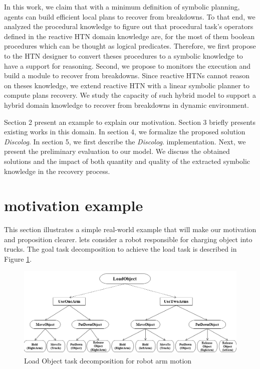 \documentclass[conference]{IEEEtran}
\begin{document}
	\par In this work, we claim  that with a minimum definition of symbolic planning, agents can build efficient local plans to recover from breakdowns. To that end, we analyzed the procedural knowledge to figure out that procedural task's operators defined in the reactive HTN domain knowledge are, for the most of them boolean procedures which can be thought as logical predicates. Therefore,  we first propose to the HTN designer to convert theses procedures to a symbolic knowledge to have a support for reasoning. Second, we propose to monitors the execution and build a module to recover from breakdowns. Since reactive HTNs cannot reason on theses knowledge, we  extend  reactive HTN  with a linear symbolic planner  to compute plans recovery.  We study the capacity of such hybrid model to support a hybrid domain knowledge to recover from breakdowns in dynamic environment.	
	
	\par Section 2 present an example to explain our motivation. Section 3 briefly presents existing works in this domain. In section 4, we formalize the proposed solution \textit{Discolog}. In section 5, we first  describe the \textit{Discolog}. implementation. Next, we present the preliminary evaluation to our model. We discuss the obtained solutions and the impact of both quantity and quality of the extracted symbolic knowledge in the recovery process.
	\section{motivation example}
	This section illustrates a simple real-world example that will make our motivation and proposition clearer. lets consider a robot responsible for charging object into trucks. The  goal task decomposition to achieve the load task is described in Figure \ref{fig:ex}.

	\label{sec:example}
	\begin{figure}[t]

	\includegraphics[width=\textwidth]{Figures/example}
	\caption{Load Object task decomposition for robot arm motion}
	\label{fig:ex}
	\end{figure}
 
\end{document}
